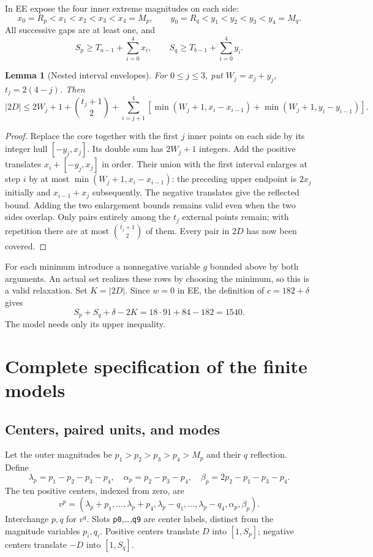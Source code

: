 \documentclass[11pt,a4paper]{article}
\newtheorem{lemma}[theorem]{Lemma}
\begin{document}
In EE expose the four inner extreme magnitudes on each side:
\[
 x_0=R_p<x_1<x_2<x_3<x_4=M_p,\qquad
 y_0=R_q<y_1<y_2<y_3<y_4=M_q.
\]
All successive gaps are at least one, and
\begin{equation}\label{eq:innermass}
 S_p\ge T_{a-1}+\sum_{i=0}^4x_i,
 \qquad S_q\ge T_{b-1}+\sum_{i=0}^4y_i.
\end{equation}
\begin{lemma}[Nested interval envelopes]\label{lem:envelope}
For $0\le j\le3$, put $W_j=x_j+y_j$, $t_j=2(4-j)$. Then
\begin{equation}\label{eq:envelope}
 |2D|\le2W_j+1+\binom{t_j+1}{2}
 +\sum_{i=j+1}^4\!\left[
 \min(W_j+1,x_i-x_{i-1})+\min(W_j+1,y_i-y_{i-1})\right].
\end{equation}
\end{lemma}
\begin{proof}
Replace the core together with the first $j$ inner points on each side
by its integer hull $[-y_j,x_j]$. Its double sum has $2W_j+1$ integers.
Add the positive translates $x_i+[-y_j,x_j]$ in order. Their union with
the first interval enlarges at step $i$ by at most
$\min(W_j+1,x_i-x_{i-1})$: the preceding upper endpoint is $2x_j$
initially and $x_{i-1}+x_j$ subsequently. The negative translates give
the reflected bound. Adding the two enlargement bounds remains valid
even when the two sides overlap. Only pairs entirely among the $t_j$
external points remain; with repetition there are at most
$\binom{t_j+1}{2}$ of them. Every pair in $2D$ has now been covered.
\end{proof}
For each minimum introduce a nonnegative variable $g$ bounded above by
both arguments. An actual set realizes these rows by choosing the
minimum, so this is a valid relaxation. Set $K=|2D|$.
Since $w=0$ in EE, the definition of $c=182+\delta$ gives
\begin{equation}\label{eq:cardinality}
 S_p+S_q+\delta-2K=18\cdot91+84-182=1540.
\end{equation}
The model needs only its upper inequality.

\section{Complete specification of the finite models}
\subsection{Centers, paired units, and modes}
Let the outer magnitudes be $p_1>p_2>p_3>p_4>M_p$ and their $q$
reflection. Define
\[
 \lambda_p=p_1-p_2-p_3-p_4,\quad
 \alpha_p=p_2-p_3-p_4,\quad\beta_p=2p_2-p_1-p_3-p_4.
\]
The ten positive centers, indexed from zero, are
\[
 v^p=(\lambda_p+p_1,\ldots,\lambda_p+p_4,
       \lambda_p-q_1,\ldots,\lambda_p-q_4,\alpha_p,\beta_p).
\]
Interchange $p,q$ for $v^q$. Slots \texttt{p0},\ldots,\texttt{q9}
are center labels, distinct from the magnitude variables $p_i,q_i$.
Positive centers translate $D$ into $[1,S_p]$; negative centers
translate $-D$ into $[1,S_q]$.
\end{document}
